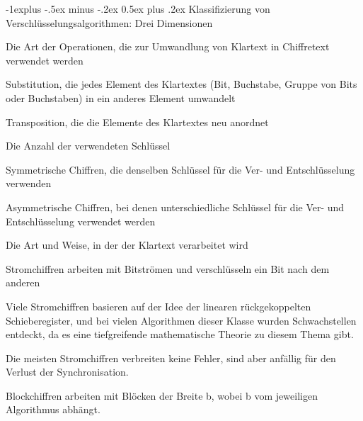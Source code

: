 \documentclass[a4paper]{article}
\makeatletter
\renewcommand{\subsection}{\@startsection{subsection}{2}{0mm}%
 {-1explus -.5ex minus -.2ex}%
 {0.5ex plus .2ex}%
 {\normalfont\normalsize\bfseries}}
\makeatother
\begin{document}
\begin{multicols}{3}
      \subsection{Klassifizierung von Verschlüsselungsalgorithmen: Drei Dimensionen}
      \begin{itemize*}
            \item Die Art der Operationen, die zur Umwandlung von Klartext in Chiffretext verwendet werden
            \begin{itemize*}
                  \item Substitution, die jedes Element des Klartextes (Bit, Buchstabe, Gruppe von Bits oder Buchstaben) in ein anderes Element umwandelt
                  \item Transposition, die die Elemente des Klartextes neu anordnet
            \end{itemize*}
            \item Die Anzahl der verwendeten Schlüssel
            \begin{itemize*}
                  \item Symmetrische Chiffren, die denselben Schlüssel für die Ver- und Entschlüsselung verwenden
                  \item Asymmetrische Chiffren, bei denen unterschiedliche Schlüssel für die Ver- und Entschlüsselung verwendet werden
            \end{itemize*}
            \item Die Art und Weise, in der der Klartext verarbeitet wird
            \begin{itemize*}
                  \item Stromchiffren arbeiten mit Bitströmen und verschlüsseln ein Bit nach dem anderen
                  \begin{itemize*}
                        \item Viele Stromchiffren basieren auf der Idee der linearen rückgekoppelten Schieberegister, und bei vielen Algorithmen dieser Klasse wurden Schwachstellen entdeckt, da es eine tiefgreifende mathematische Theorie zu diesem Thema gibt.
                        \item Die meisten Stromchiffren verbreiten keine Fehler, sind aber anfällig für den Verlust der Synchronisation.
                  \end{itemize*}
                  \item Blockchiffren arbeiten mit Blöcken der Breite b, wobei b vom jeweiligen Algorithmus abhängt.
            \end{itemize*}
      \end{itemize*}



\end{multicols}
\end{document}
